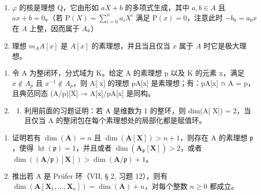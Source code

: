 \begin{enumerate}
\def\labelenumi{\alph{enumi})}
\item
  \(\varphi\) 的核是理想 Q，它由形如 \(aX + b\) 的多项式生成，其中 \(a, b \in A\) 且 \(ax + b = 0\)。（若 \(\mathrm{P}(X) = \sum_{i=0}^{n} a_i X^i\) 满足 \(\mathrm{P}(x) = 0\)，注意此时 \(-b_0 = a_0 x\) 在 \(A\) 上整，因而属于 \(A\)。）
\item
  理想 \(m_A A[x]\) 是 \(A[x]\) 的素理想，并且当且仅当 \(x\) 属于 \(A\) 时它是极大理想。
\end{enumerate}

\begin{enumerate}
\def\labelenumi{\arabic{enumi})}
\setcounter{enumi}{4}
\item
  令 A 为整闭环，分式域为 K。给定 A 的素理想 p 以及 K 的元素 x，满足 \(x \notin A_{p}\) 且 \(x^{-1} \notin A_{p}\)，则 A{[} x{]} 的理想 pA{[}x{]} 是素理想；有：pA{[}x{]} ∩ A = p，且典范同态 (A/p){[}X{]} → A{[}x{]}/pA{[}x{]} 是同构。
\item
  \begin{enumerate}
  \def\labelenumii{\alph{enumii})}
  \tightlist
  \item
    利用前面的习题证明：若 A 是维数为 1 的整环，则 dim(A{[} X{]}) = 2，当且仅当 A 的整闭包在每个素理想处的局部化都是赋值环。
  \end{enumerate}
\end{enumerate}

\begin{enumerate}
\def\labelenumi{\alph{enumi})}
\setcounter{enumi}{1}
\tightlist
\item
  证明若有 \(\dim(\mathbf{A}) = n\) 且 \(\dim(\mathbf{A}[\mathbf{X}]) > n + 1\)，则存在 A 的素理想 \(\mathfrak{p}\)，使得 \(\operatorname{ht}(\mathfrak{p}) = 1\)，并且或者 \(\dim(\mathbf{A}_{\mathfrak{p}}[\mathbf{X}]) > 2\)，或者 \(\dim((\mathbf{A}/\mathfrak{p})[\mathbf{X}]) > \dim(\mathbf{A}/\mathfrak{p}) + 1\)。
\item
  推出若 A 是 Prüfer 环（VII, § 2, 习题 12），则有 \(\dim(\mathbf{A}[\mathbf{X}_1, ..., \mathbf{X}_n]) = \dim(\mathbf{A}) + n\)，对每个整数 \(n \geqslant 0\) 都成立。
\end{enumerate}

